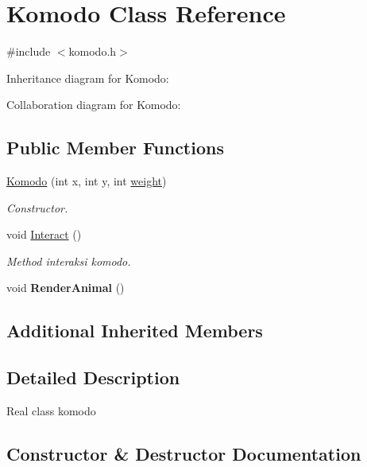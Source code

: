 \hypertarget{classKomodo}{}\section{Komodo Class Reference}
\label{classKomodo}


{\ttfamily \#include $<$komodo.\+h$>$}



Inheritance diagram for Komodo\+:


Collaboration diagram for Komodo\+:
\subsection*{Public Member Functions}
\begin{DoxyCompactItemize}
\item 
\hyperlink{classKomodo_aa040951c2340068812bb513d87948947}{Komodo} (int x, int y, int \hyperlink{classAnimal_a9a3b22f243f7109c57f36b3c660feb6e}{weight})
\begin{DoxyCompactList}\small\item\em Constructor. \end{DoxyCompactList}\item 
void \hyperlink{classKomodo_ab3b3b931d96321b809f6db8c04f2dc77}{Interact} ()\hypertarget{classKomodo_ab3b3b931d96321b809f6db8c04f2dc77}{}\label{classKomodo_ab3b3b931d96321b809f6db8c04f2dc77}

\begin{DoxyCompactList}\small\item\em Method interaksi komodo. \end{DoxyCompactList}\item 
void {\bfseries Render\+Animal} ()\hypertarget{classKomodo_ae34363afb6c2505ae1a03fa32f9a8c8a}{}\label{classKomodo_ae34363afb6c2505ae1a03fa32f9a8c8a}

\end{DoxyCompactItemize}
\subsection*{Additional Inherited Members}


\subsection{Detailed Description}
Real class komodo 

\subsection{Constructor \& Destructor Documentation}
